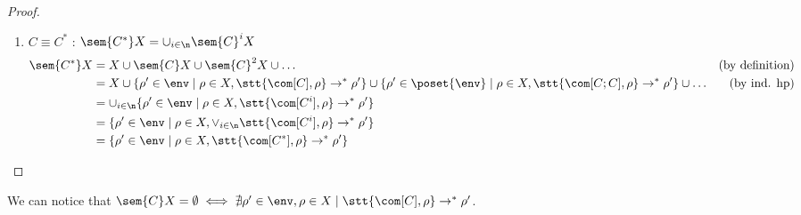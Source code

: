 \begin{proof}
\begin{enumerate}
  \item \(C \equiv C^*\) : \(\sem{C^*}X = \cup_{i\in\n}\sem{C}^i X\)
    \begin{align*}
      \sem{C^*}X & = X \cup \sem{C}X \cup \sem{C}^2X \cup \dots & \text{(by definition)}\\
      & = X \cup \{\rho' \in\env \mid \rho \in X, \stt{\com[C],\rho} \to^* \rho'\} \cup \{\rho' \in\poset{\env} \mid \rho \in X, \stt{\com[C;C],\rho} \to^* \rho'\} \cup \dots & \text{(by ind. hp)}\\
      & = \cup_{i\in\n} \{\rho' \in\env \mid \rho \in X, \stt{\com[C^i], \rho} \to^*  \rho'\} \\
      & = \{\rho' \in\env \mid \rho \in X, \vee_{i\in\n} \stt{\com[C^i], \rho} \to^* \rho'\} \\
      & = \{\rho' \in\env \mid \rho \in X, \stt{\com[C^*], \rho} \to^* \rho'\}
    \end{align*}
  \end{enumerate}
\end{proof}

We can notice that \(\sem{C}X = \emptyset \iff \nexists \rho'\in\env,
\rho \in X \mid \stt{\com[C],\rho} \to^* \rho'\).
